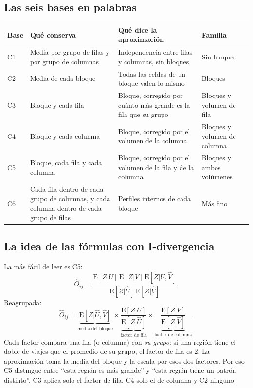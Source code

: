 \documentclass[11pt,a4paper]{article}
\begin{document}
\subsection{Las seis bases en palabras}

\begin{center}
\renewcommand{\arraystretch}{1.3}
\footnotesize
\begin{tabular}{@{}l>{\raggedright\arraybackslash}p{4.4cm}>{\raggedright\arraybackslash}p{5.6cm}>{\raggedright\arraybackslash}p{2.4cm}@{}}
\toprule
\textbf{Base} & \textbf{Qué conserva} & \textbf{Qué dice la aproximación} & \textbf{Familia} \\
\midrule
C1 & Media por grupo de filas y por grupo de columnas & Independencia entre filas y columnas, sin bloques & Sin bloques \\
\midrule
C2 & Media de cada bloque & Todas las celdas de un bloque valen lo mismo & Bloques \\
\midrule
C3 & Bloque y cada fila & Bloque, corregido por cuánto más grande es la fila que su grupo & Bloques y volumen de fila \\
\midrule
C4 & Bloque y cada columna & Bloque, corregido por el volumen de la columna & Bloques y volumen de columna \\
\midrule
C5 & Bloque, cada fila y cada columna & Bloque, corregido por el volumen de la fila y de la columna & Bloques y ambos volúmenes \\
\midrule
C6 & Cada fila dentro de cada grupo de columnas, y cada columna dentro de cada grupo de filas & Perfiles internos de cada bloque & Más fino \\
\bottomrule
\end{tabular}
\end{center}

\subsection{La idea de las fórmulas con I-divergencia}

La más fácil de leer es C5:
\[
  \hat O_{ij}=\frac{\mathrm{E}[Z|U]\,\mathrm{E}[Z|V]\,\mathrm{E}[Z|\hat U,\hat V]}
  {\mathrm{E}[Z|\hat U]\,\mathrm{E}[Z|\hat V]}.
\]
Reagrupada:
\[
  \hat O_{ij}=\underbrace{\mathrm{E}[Z|\hat U,\hat V]}_{\text{media del bloque}}
  \times\underbrace{\frac{\mathrm{E}[Z|U]}{\mathrm{E}[Z|\hat U]}}_{\text{factor de fila}}
  \times\underbrace{\frac{\mathrm{E}[Z|V]}{\mathrm{E}[Z|\hat V]}}_{\text{factor de columna}}.
\]
Cada factor compara una fila (o columna) con \emph{su grupo}: si una región tiene
el doble de viajes que el promedio de su grupo, el factor de fila es 2. La
aproximación toma la media del bloque y la escala por esos dos factores. Por eso
C5 distingue entre ``esta región es más grande'' y ``esta región tiene un patrón
distinto''. C3 aplica solo el factor de fila, C4 solo el de columna y C2 ninguno.
\end{document}
